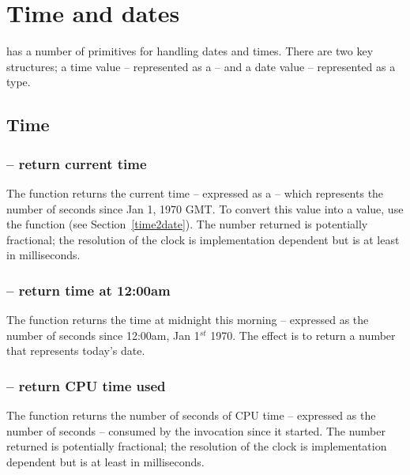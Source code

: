 \chapter{Time and dates}
\label{time}

\go has a number of primitives for handling dates and times. There are two key structures; a time value -- represented as a  -- and a date value -- represented as a  type.

\section{Time}
\label{time:time}

\subsection{ -- return current time}
\label{time:now}


The  function returns the current time -- expressed as a  -- which represents the number of seconds since Jan 1, 1970 GMT. To convert this value into a  value, use the  function (see Section~\vref{time2date}).  The number returned is potentially fractional; the resolution of the clock is implementation dependent but is at least in milliseconds.


\subsection{ -- return time at 12:00am}
\label{time:today}


The  function returns the time at midnight this morning -- expressed as the number of seconds since 12:00am, Jan 1$^{st}$ 1970. The effect is to return a number that represents today's date.

\subsection{ -- return CPU time used}
\label{time:ticks}


The  function returns the number of seconds of CPU time -- expressed as the number of seconds -- consumed by the \go invocation since it started. The number returned is potentially fractional; the resolution of the clock is implementation dependent but is at least in milliseconds.

